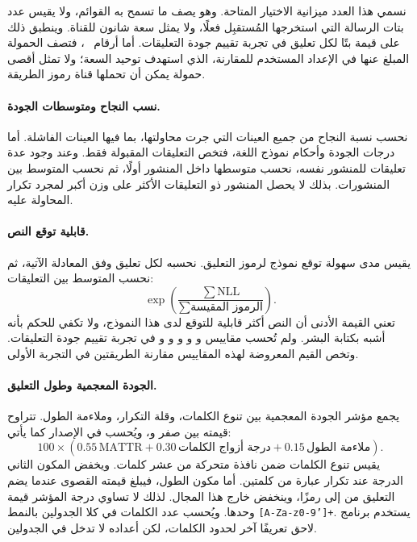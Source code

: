 نسمي هذا العدد ميزانية الاختيار المتاحة. وهو يصف ما تسمح به القوائم، ولا يقيس عدد بتات الرسالة التي استخرجها المُستقبِل فعلًا، ولا يمثل سعة شانون للقناة.
وينطبق ذلك على قيمة  بتًا لكل تعليق في تجربة تقييم جودة التعليقات.
أما أرقام ~\cite{lin2024zero}، فتصف الحمولة المبلغ عنها في الإعداد المستخدم للمقارنة، الذي استهدف توحيد السعة؛ ولا تمثل أقصى حمولة يمكن أن تحملها قناة رموز الطريقة.

\paragraph{نسب النجاح ومتوسطات الجودة.}
نحسب نسبة النجاح من جميع العينات التي جرت محاولتها، بما فيها العينات الفاشلة.
أما درجات الجودة وأحكام نموذج اللغة، فتخص التعليقات المقبولة فقط.
وعند وجود عدة تعليقات للمنشور نفسه، نحسب متوسطها داخل المنشور أولًا، ثم نحسب المتوسط بين المنشورات. بذلك لا يحصل المنشور ذو التعليقات الأكثر على وزن أكبر لمجرد تكرار المحاولة عليه.

\paragraph{قابلية توقع النص.}
يقيس  مدى سهولة توقع نموذج  لرموز التعليق.
نحسبه لكل تعليق وفق المعادلة الآتية، ثم نحسب المتوسط بين التعليقات:
\[
\exp\left(\frac{\sum \mathrm{NLL}}{\sum \text{الرموز المقيسة}}\right).
\]
تعني القيمة الأدنى أن النص أكثر قابلية للتوقع لدى هذا النموذج، ولا تكفي للحكم بأنه أشبه بكتابة البشر.
ولم تُحسب مقاييس  و و و و و في تجربة تقييم جودة التعليقات. وتخص القيم المعروضة لهذه المقاييس مقارنة الطريقتين في التجربة الأولى.

\paragraph{الجودة المعجمية وطول التعليق.}
يجمع مؤشر الجودة المعجمية بين تنوع الكلمات، وقلة التكرار، وملاءمة الطول. تتراوح قيمته بين صفر و، ويُحسب في الإصدار  كما يأتي:
\[
100\times(0.55\,\mathrm{MATTR}+0.30\,\text{درجة أزواج الكلمات}+0.15\,\text{ملاءمة الطول}).
\]
يقيس  تنوع الكلمات ضمن نافذة متحركة من عشر كلمات. ويخفض المكون الثاني الدرجة عند تكرار عبارة من كلمتين.
أما مكون الطول، فيبلغ قيمته القصوى عندما يضم التعليق من  إلى  رمزًا، وينخفض خارج هذا المجال.
لذلك لا تساوي درجة المؤشر قيمة  وحدها.
ويُحسب عدد الكلمات في كلا الجدولين بالنمط \texttt{[A-Za-z0-9']+}. يستخدم برنامج لاحق تعريفًا آخر لحدود الكلمات، لكن أعداده لا تدخل في الجدولين.

